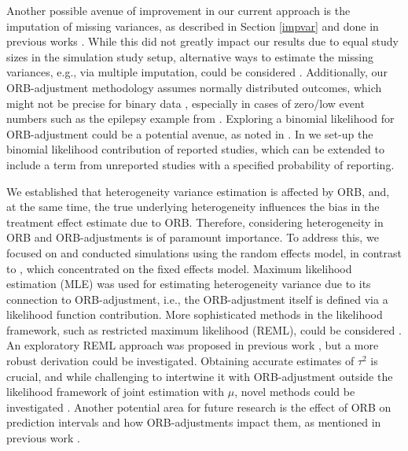 \documentclass[twocolumn]{article}\usepackage[]{graphicx}\usepackage[]{xcolor}
\begin{document}
Another possible avenue of improvement in our current approach is the imputation of missing variances, as described in Section \ref{impvar} and done in previous works \citep{Copas2014, Copas2019, Bay, mythesis}. While this did not greatly impact our results due to equal study sizes in the simulation study setup, alternative ways to estimate the missing variances, e.g., via multiple imputation, could be considered \citep{var_imp, var_imp2}. Additionally, our ORB-adjustment methodology assumes normally distributed outcomes, which might not be precise for binary data \citep{Copas2014, Copas2019}, especially in cases of zero/low event numbers such as the epilepsy example from \citet{Copas2019}. Exploring a binomial likelihood for ORB-adjustment could be a potential avenue, as noted in \citet{mythesis}. In \citet{mythesis} we set-up the binomial likelihood contribution of reported studies, which can be extended to include a term from unreported studies with a specified probability of reporting.

We established that heterogeneity variance estimation is affected by ORB, and, at the same time, the true underlying heterogeneity influences the bias in the treatment effect estimate due to ORB. Therefore, considering heterogeneity in ORB and ORB-adjustments is of paramount importance. To address this, we focused on and conducted simulations using the random effects model, in contrast to \citet{Copas2019}, which concentrated on the fixed effects model. Maximum likelihood estimation (MLE) was used for estimating heterogeneity variance due to its connection to ORB-adjustment, i.e.,  the ORB-adjustment itself is defined via a likelihood function contribution. More sophisticated methods in the likelihood framework, such as restricted maximum likelihood (REML), could be considered \citep{REML, tauCI, REML2, mythesis}. An exploratory REML approach was proposed in previous work \citep{mythesis}, but a more robust derivation could be investigated. Obtaining accurate estimates of $\tau^2$ is crucial, and while challenging to intertwine it with ORB-adjustment outside the likelihood framework of joint estimation with $\mu$, novel methods could be investigated \citep{tauCI, REML, REML2}. Another potential area for future research is the effect of ORB on prediction intervals \citep{PI_coverage} and how ORB-adjustments impact them, as mentioned in previous work \citep{mythesis}.
\end{document}
